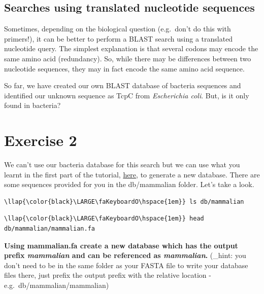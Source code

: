 \documentclass[11pt]{article}
\begin{document}
    \hypertarget{searches-using-translated-nucleotide-sequences}{%
\subsection{Searches using translated nucleotide
sequences}\label{searches-using-translated-nucleotide-sequences}}

Sometimes, depending on the biological question (e.g.~don't do this with
primers!), it can be better to perform a BLAST search using a translated
nucleotide query. The simplest explanation is that several codons may
encode the same amino acid (redundancy). So, while there may be
differences between two nucleotide sequences, they may in fact encode
the same amino acid sequence.

So far, we have created our own BLAST database of bacteria sequences and
identified our unknown sequence as TcpC from \textit{Escherichia coli}.
But, is it only found in bacteria?

    \hypertarget{exercise-2}{%
\section{Exercise 2}\label{exercise-2}}

We can't use our bacteria database for this search but we can use what
you learnt in the first part of the tutorial,
\href{format_database.ipynb}{here}, to generate a new database. There
are some sequences provided for you in the db/mammalian folder. Let's
take a look.

\begin{terminalinput}
\begin{Verbatim}[commandchars=\\\{\}]
\llap{\color{black}\LARGE\faKeyboardO\hspace{1em}} ls db/mammalian
\end{Verbatim}
\end{terminalinput}

\begin{terminalinput}
\begin{Verbatim}[commandchars=\\\{\}]
\llap{\color{black}\LARGE\faKeyboardO\hspace{1em}} head db/mammalian/mammalian.fa
\end{Verbatim}
\end{terminalinput}

    \textbf{Using mammalian.fa create a new database which has the output
prefix \textit{mammalian} and can be referenced as \textit{mammalian}.}
(\_hint: you don't need to be in the same folder as your FASTA file to
write your database files there, just prefix the output prefix with the
relative location - e.g.~db/mammalian/mammalian)
\end{document}

